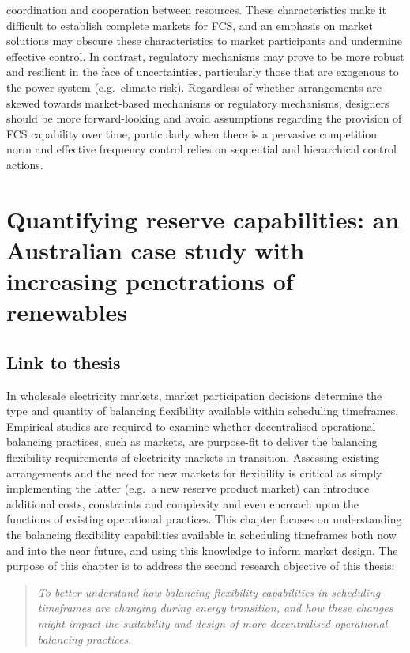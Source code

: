 \documentclass[12pt,a4paper,]{report}
\begin{document}
\begin{enumerate}
  coordination and cooperation between resources. These characteristics
  make it difficult to establish complete markets for FCS, and an
  emphasis on market solutions may obscure these characteristics to
  market participants and undermine effective control. In contrast,
  regulatory mechanisms may prove to be more robust and resilient in the
  face of uncertainties, particularly those that are exogenous to the
  power system (e.g.~climate risk). Regardless of whether arrangements
  are skewed towards market-based mechanisms or regulatory mechanisms,
  designers should be more forward-looking and avoid assumptions
  regarding the provision of FCS capability over time, particularly when
  there is a pervasive competition norm and effective frequency control
  relies on sequential and hierarchical control actions.
\end{enumerate}

\hypertarget{sec:reserves}{%
\chapter{Quantifying reserve capabilities: an Australian case study with
increasing penetrations of renewables}\label{sec:reserves}}

\hypertarget{link-to-thesis-1}{%
\section{Link to thesis}\label{link-to-thesis-1}}

In wholesale electricity markets, market participation decisions
determine the type and quantity of balancing flexibility available
within scheduling timeframes. Empirical studies are required to examine
whether decentralised operational balancing practices, such as markets,
are purpose-fit to deliver the balancing flexibility requirements of
electricity markets in transition. Assessing existing arrangements and
the need for new markets for flexibility is critical as simply
implementing the latter (e.g.~a new reserve product market) can
introduce additional costs, constraints and complexity and even encroach
upon the functions of existing operational practices. This chapter
focuses on understanding the balancing flexibility capabilities
available in scheduling timeframes both now and into the near future,
and using this knowledge to inform market design. The purpose of this
chapter is to address the second research objective of this thesis:

\begin{quote}
\emph{To better understand how balancing flexibility capabilities in
scheduling timeframes are changing during energy transition, and how
these changes might impact the suitability and design of more
decentralised operational balancing practices.}
\end{quote}
\end{document}
